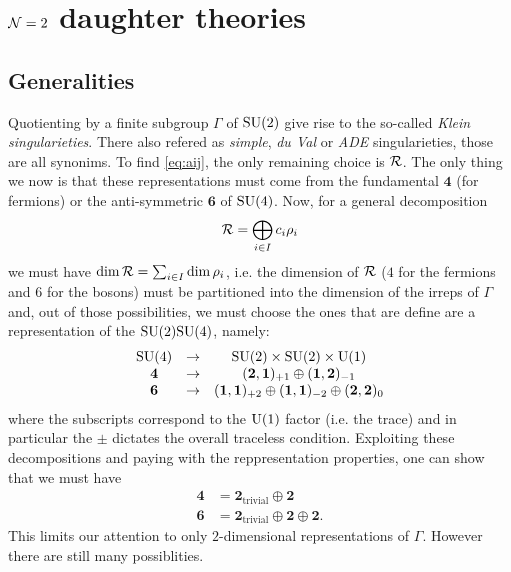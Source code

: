\section{$\mathcal{N}=2$ daughter theories}\label{sec:N2QGT}

    \subsection{Generalities}

        Quotienting by a finite subgroup $\Gamma$ of $\text{SU}(2)$ give rise to the so-called \emph{Klein singularieties}. There also refered as \emph{simple}, \emph{du Val} or \emph{ADE} singularieties, those are all synonims. To find \eqref{eq:aij}, the only remaining choice is $\mathcal{R}$. The only thing we now is that these representations must come from the fundamental $\boldsymbol{4}$ (for fermions) or the anti-symmetric $\boldsymbol{6}$ of $\text{SU}(4)$. Now, for a general decomposition
        \begin{equation}
            \mathcal{R}=\bigoplus_{i\in I}c_i\rho_i
        \end{equation}
        we must have $\dim\mathcal{R}=\sum_{i\in I}\dim\rho_i$, i.e. the dimension of $\mathcal{R}$ ($4$ for the fermions and $6$ for the bosons) must be partitioned into the dimension of the irreps of $\Gamma$ and, out of those possibilities, we must choose the ones that are define are a representation of the $\text{SU}(2)\text{SU}(4)$, namely:
        \begin{equation}
            \begin{array}{ccc}
                \text{SU}(4)&\to&\text{SU}(2)\times\text{SU}(2)\times\text{U}(1)\\
                \boldsymbol{4}&\to&(\boldsymbol{2},\boldsymbol{1})_{+1}\oplus(\boldsymbol{1},\boldsymbol{2})_{-1}\\
                \boldsymbol{6}&\to&(\boldsymbol{1},\boldsymbol{1})_{+2}\oplus(\boldsymbol{1},\boldsymbol{1})_{-2}\oplus(\boldsymbol{2},\boldsymbol{2})_{0}
            \end{array}
        \end{equation}
        where the subscripts correspond to the $\text{U}(1)$ factor (i.e. the trace) and in particular the $\pm$ dictates the overall traceless condition. Exploiting these decompositions and paying with the reppresentation properties, one can show that we must have \cite{Hanany_1999}
        \begin{align}
            \boldsymbol{4}&=\boldsymbol{2}_{\text{trivial}}\oplus\boldsymbol{2}\\
            \boldsymbol{6}&=\boldsymbol{2}_{\text{trivial}}\oplus\boldsymbol{2}\oplus\boldsymbol{2}.
        \end{align}
        This limits our attention to only $2$-dimensional representations of $\Gamma$. However there are still many possiblities.
        
